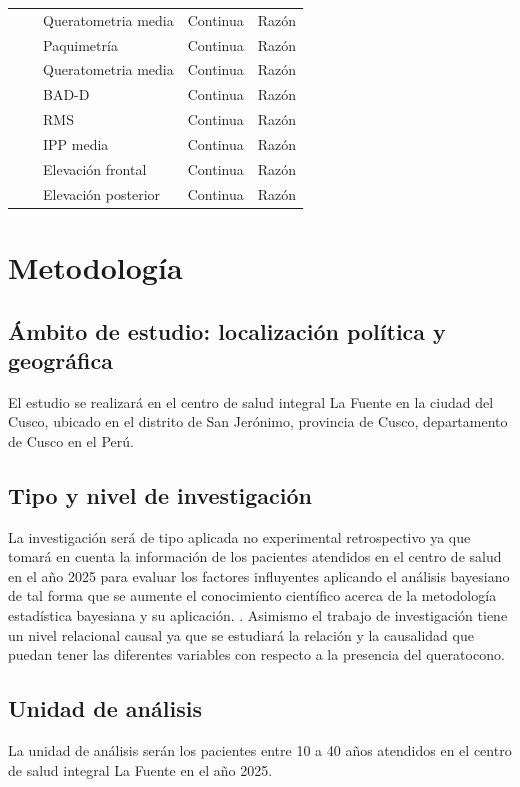 \begin{landscape}
\begin{longtable}{p{4cm}p{6.5cm}p{5cm}p{3cm}p{2.5cm}}
    \cline{3-5}
    & & Queratometria media & Continua & Razón \\
    \cline{3-5}
    & & Paquimetría & Continua & Razón \\
    \cline{3-5}
    & & Queratometria media & Continua & Razón \\
    \cline{3-5}
    & & BAD-D & Continua & Razón \\
    \cline{3-5}
    & & RMS & Continua & Razón \\
    \cline{3-5}
    & & IPP media & Continua & Razón \\
    \cline{3-5}
    & & Elevación frontal & Continua & Razón \\
    \cline{3-5}
    & & Elevación posterior & Continua & Razón \\
    \hline
\end{longtable}

\end{landscape}

\section{Metodología}
\subsection{Ámbito de estudio: localización política y geográfica}
El estudio se realizará en el centro de salud integral La Fuente en la ciudad del Cusco, ubicado en el distrito de San Jerónimo, provincia de Cusco, departamento de Cusco en el Perú.

\subsection{Tipo y nivel de investigación}
La investigación será de tipo aplicada no experimental retrospectivo ya que tomará en cuenta la información de los pacientes atendidos en el centro de salud en el año 2025 para evaluar los factores influyentes aplicando el análisis bayesiano de tal forma que se aumente el conocimiento científico acerca de la metodología estadística bayesiana y su aplicación. \cite{hernandez2004introduccion}.
Asimismo el trabajo de investigación tiene un nivel relacional causal ya que se estudiará la relación y la causalidad que puedan tener las diferentes variables con respecto a la presencia del queratocono.

\subsection{Unidad de análisis}
La unidad de análisis serán los pacientes entre 10 a 40 años atendidos en el centro de salud integral La Fuente en el año 2025.

